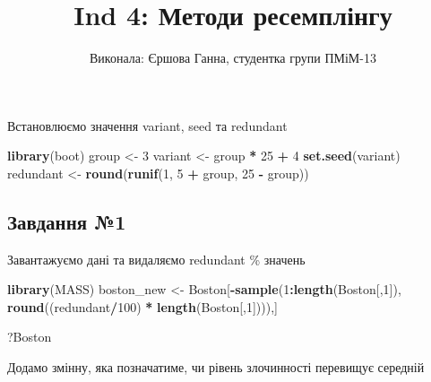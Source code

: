 \documentclass[
]{article}
\title{Ind 4: Методи ресемплінгу}
\subtitle{Виконала: Єршова Ганна, студентка групи ПМіМ-13}
\author{}
\date{\vspace{-2.5em}}
\newenvironment{Shaded}{\begin{snugshade}}{\end{snugshade}}
\newcommand{\DecValTok}[1]{\textcolor[rgb]{0.00,0.00,0.81}{#1}}
\newcommand{\FunctionTok}[1]{\textcolor[rgb]{0.13,0.29,0.53}{\textbf{#1}}}
\newcommand{\NormalTok}[1]{#1}
\newcommand{\OtherTok}[1]{\textcolor[rgb]{0.56,0.35,0.01}{#1}}
\newcommand{\SpecialCharTok}[1]{\textcolor[rgb]{0.81,0.36,0.00}{\textbf{#1}}}
\begin{document}
\maketitle

Встановлюємо значення variant, seed та redundant

\begin{Shaded}
\begin{Highlighting}[]
\FunctionTok{library}\NormalTok{(boot)}
\NormalTok{group }\OtherTok{\textless{}{-}} \DecValTok{3}
\NormalTok{variant }\OtherTok{\textless{}{-}}\NormalTok{ group }\SpecialCharTok{*} \DecValTok{25} \SpecialCharTok{+} \DecValTok{4}
\FunctionTok{set.seed}\NormalTok{(variant)}
\NormalTok{redundant }\OtherTok{\textless{}{-}} \FunctionTok{round}\NormalTok{(}\FunctionTok{runif}\NormalTok{(}\DecValTok{1}\NormalTok{, }\DecValTok{5} \SpecialCharTok{+}\NormalTok{ group, }\DecValTok{25} \SpecialCharTok{{-}}\NormalTok{ group))}
\end{Highlighting}
\end{Shaded}

\subsection{Завдання
№1}\label{ux437ux430ux432ux434ux430ux43dux43dux44f-1}

Завантажуємо дані та видаляємо redundant \% значень

\begin{Shaded}
\begin{Highlighting}[]
\FunctionTok{library}\NormalTok{(MASS)}
\NormalTok{boston\_new }\OtherTok{\textless{}{-}}\NormalTok{ Boston[}\SpecialCharTok{{-}}\FunctionTok{sample}\NormalTok{(}\DecValTok{1}\SpecialCharTok{:}\FunctionTok{length}\NormalTok{(Boston[,}\DecValTok{1}\NormalTok{]), }\FunctionTok{round}\NormalTok{((redundant}\SpecialCharTok{/}\DecValTok{100}\NormalTok{) }\SpecialCharTok{*} \FunctionTok{length}\NormalTok{(Boston[,}\DecValTok{1}\NormalTok{]))),]}
\end{Highlighting}
\end{Shaded}

\begin{Shaded}
\begin{Highlighting}[]
\NormalTok{?Boston}
\end{Highlighting}
\end{Shaded}

Додамо змінну, яка позначатиме, чи рівень злочинності перевищує середній

\begin{Shaded}
\end{Shaded}
\end{document}
